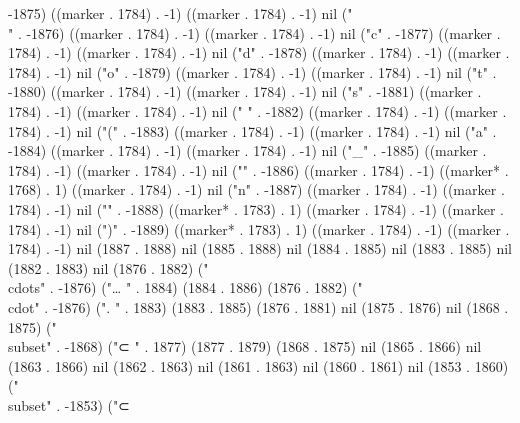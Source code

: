 -1875) ((marker . 1784) . -1) ((marker . 1784) . -1) nil ("\\" . -1876) ((marker . 1784) . -1) ((marker . 1784) . -1) nil ("c" . -1877) ((marker . 1784) . -1) ((marker . 1784) . -1) nil ("d" . -1878) ((marker . 1784) . -1) ((marker . 1784) . -1) nil ("o" . -1879) ((marker . 1784) . -1) ((marker . 1784) . -1) nil ("t" . -1880) ((marker . 1784) . -1) ((marker . 1784) . -1) nil ("s" . -1881) ((marker . 1784) . -1) ((marker . 1784) . -1) nil (" " . -1882) ((marker . 1784) . -1) ((marker . 1784) . -1) nil ("(" . -1883) ((marker . 1784) . -1) ((marker . 1784) . -1) nil ("a" . -1884) ((marker . 1784) . -1) ((marker . 1784) . -1) nil ("_" . -1885) ((marker . 1784) . -1) ((marker . 1784) . -1) nil ("{" . -1886) ((marker . 1784) . -1) ((marker* . 1768) . 1) ((marker . 1784) . -1) nil ("n" . -1887) ((marker . 1784) . -1) ((marker . 1784) . -1) nil ("}" . -1888) ((marker* . 1783) . 1) ((marker . 1784) . -1) ((marker . 1784) . -1) nil (")" . -1889) ((marker* . 1783) . 1) ((marker . 1784) . -1) ((marker . 1784) . -1) nil (1887 . 1888) nil (1885 . 1888) nil (1884 . 1885) nil (1883 . 1885) nil (1882 . 1883) nil (1876 . 1882) ("\\cdots" . -1876) ("…
" . 1884) (1884 . 1886) (1876 . 1882) ("\\cdot" . -1876) (".
" . 1883) (1883 . 1885) (1876 . 1881) nil (1875 . 1876) nil (1868 . 1875) ("\\subset" . -1868) ("⊂
" . 1877) (1877 . 1879) (1868 . 1875) nil (1865 . 1866) nil (1863 . 1866) nil (1862 . 1863) nil (1861 . 1863) nil (1860 . 1861) nil (1853 . 1860) ("\\subset" . -1853) ("⊂
